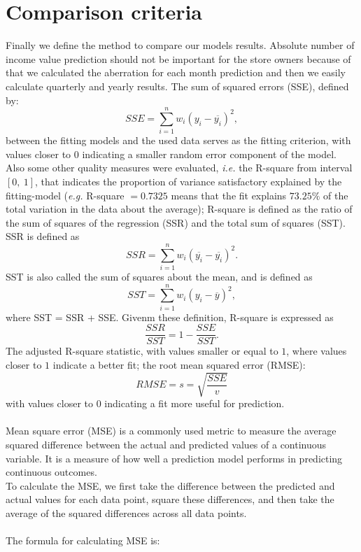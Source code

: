     \section{Comparison criteria} \label{subsec:comparison}
    Finally we define the method to compare our models results.
    Absolute number of income value prediction should not be important for the store owners because of that we
    calculated the aberration for each month prediction and then we easily calculate quarterly and yearly results.
    The sum of squared errors (SSE), defined by:
    $$SSE = \sum^n_{i=1}w_i(y_i - \overline{y_i})^2,$$
    between the fitting models and the used data serves as the fitting criterion,
    with values closer to $0$ indicating a smaller random error component of the model.
    Also some other quality measures were evaluated, \textit{i.e.} the R-square from interval $[0,\ 1]$,
    that indicates the proportion of variance satisfactory explained by the fitting-model (\textit{e.g.}
    R-square $= 0.7325$ means that the fit explains $73.25\%$ of the total variation in the data about the average);
    R-square is defined as the ratio of the sum of squares of the regression (SSR) and the total sum of squares (SST).
    SSR is defined as
    $$SSR = \sum_{i=1}^nw_i(\overline{y_i} - \overline{y_i})^2.$$
    SST is also called the sum of squares about the mean, and is defined as
    $$SST = \sum_{i=1}^nw_i(y_i - \overline{y})^2,$$
    where SST = SSR + SSE. Givenm these definition, R-square is expressed as
    $$\frac{SSR}{SST} = 1 - \frac{SSE}{SST}.$$
    The adjusted R-square statistic, with values smaller or equal to $1$, where values closer to $1$ indicate a better
    fit; the root mean squared error (RMSE):\\
    $$RMSE = s = \sqrt{\frac{SSE}{v}}$$
    with values closer to $0$ indicating a fit more useful for prediction.\\
    \\
    Mean square error (MSE) is a commonly used metric to measure the average squared difference between the actual and
    predicted values of a continuous variable. It is a measure of how well a prediction model performs in predicting
    continuous outcomes.\\
    To calculate the MSE, we first take the difference between the predicted and actual values for each data point,
    square these differences, and then take the average of the squared differences across all data points.\\
    \\
    The formula for calculating MSE is:

